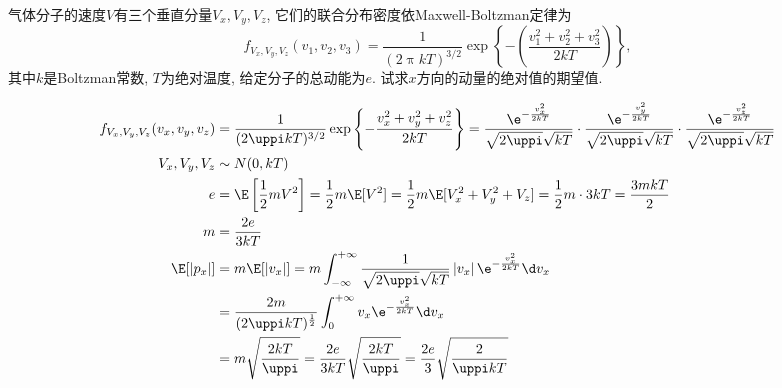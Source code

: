 \begin{problem}{1.12}
气体分子的速度$V$有三个垂直分量$V_x, V_y, V_z$, 它们的联合分布密度依Maxwell-Boltzman定律为
\[f_{V_x, V_y, V_z}(v_1, v_2, v_3) = \frac{1}{(2\uppi kT)^{3/2}}\exp\left\{-\left(\frac{v^2_1+v^2_2+v^2_3}{2kT}\right)\right\},\]
其中$k$是Boltzman常数, $T$为绝对温度, 给定分子的总动能为$e$. 试求$x$方向的动量的绝对值的期望值.
\end{problem}
\begin{solution}
	\[\begin{aligned}
			f_{V_x,V_y,V_z}(v_x,v_y,v_z) & = \frac{1}{(2\uppi kT)^{3/2}}\exp\left\{-\frac{v_x^2 + v_y^2 + v_z^2}{2kT}\right\}=\frac{\e^{-\frac{v_x^2}{2kT}}}{\sqrt{2\uppi}\sqrt{kT}}\cdot \frac{\e^{-\frac{v_y^2}{2kT}}}{\sqrt{2\uppi}\sqrt{kT}}\cdot \frac{\e^{-\frac{v_z^2}{2kT}}}{\sqrt{2\uppi}\sqrt{kT}} \\
			V_x,V_y,V_z                  & \sim N(0,kT)                                                                                                                                                                                                                                                      \\
			e                            & = \E\left[\frac{1}{2}mV^2\right]=\frac{1}{2}m\E[V^2]=\frac{1}{2}m\E[V_x^2+V_y^2+V_z]=\frac{1}{2}m\cdot 3kT=\frac{3mkT}{2}                                                                                                                                         \\
			m                            & = \frac{2e}{3kT}                                                                                                                                                                                                                                                  \\
			\E[\left|p_x\right|]         & = m\E[\left|v_x\right|]=m \int_{-\infty}^{+\infty}\frac{1}{\sqrt{2\uppi}\sqrt{kT}}\left|v_x\right|\e^{-\frac{v_x^2}{2kT}}\d v_x                                                                                                                                   \\
			                             & = \frac{2m}{(2\uppi kT)^{\frac{1}{2}}}\int_{0}^{+\infty}v_x \e^{-\frac{v_x^2}{2kT}}\d v_x                                                                                                                                                                         \\
			                             & = m\sqrt{\frac{2kT}{\uppi}} = \frac{2e}{3kT}\sqrt{\frac{2kT}{\uppi}} = \frac{2e}{3}\sqrt{\frac{2}{\uppi kT}}                                                                                                                                                      \\
		\end{aligned}\]
\end{solution}


